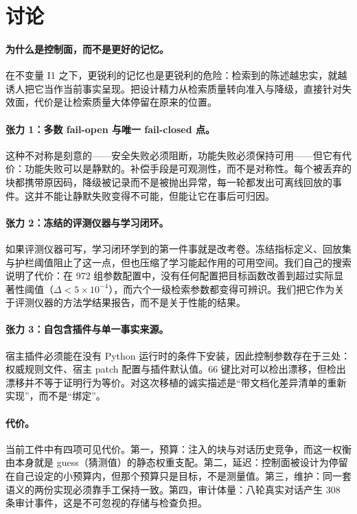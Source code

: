 \section{讨论}

\paragraph{为什么是控制面，而不是更好的记忆。} 在不变量 I1 之下，更锐利的记忆也是更锐利的危险：检索到的陈述越忠实，就越诱人把它当作当前事实呈现。把设计精力从检索质量转向准入与降级，直接针对失效面，代价是让检索质量大体停留在原来的位置。

\paragraph{张力 1：多数 fail-open 与唯一 fail-closed 点。} 这种不对称是刻意的——安全失败必须阻断，功能失败必须保持可用——但它有代价：功能失败可以是静默的。补偿手段是可观测性，而不是对称性。每个被丢弃的块都携带原因码，降级被记录而不是被抛出异常，每一轮都发出可离线回放的事件。这并不能让静默失败变得不可能，但能让它在事后可归因。

\paragraph{张力 2：冻结的评测仪器与学习闭环。} 如果评测仪器可写，学习闭环学到的第一件事就是改考卷。冻结指标定义、回放集与护栏阈值阻止了这一点，但也压缩了学习能起作用的可用空间。我们自己的搜索说明了代价：在 972 组参数配置中，没有任何配置把目标函数改善到超过实际显著性阈值（$\Delta < 5\times10^{-4}$），而六个一级检索参数都变得可辨识。我们把它作为关于评测仪器的方法学结果报告，而不是关于性能的结果。

\paragraph{张力 3：自包含插件与单一事实来源。} 宿主插件必须能在没有 Python 运行时的条件下安装，因此控制参数存在于三处：权威规则文件、宿主 patch 配置与插件默认值。66 键比对可以检出漂移，但检出漂移并不等于证明行为等价。对这次移植的诚实描述是“带文档化差异清单的重新实现”，而不是“绑定”。

\paragraph{代价。} 当前工件中有四项可见代价。第一，预算：注入的块与对话历史竞争，而这一权衡由本身就是 guess（猜测值）的静态权重支配。第二，延迟：控制面被设计为停留在自己设定的小预算内，但那个预算只是目标，不是测量值。第三，维护：同一套语义的两份实现必须靠手工保持一致。第四，审计体量：八轮真实对话产生 308 条审计事件，这是不可忽视的存储与检查负担。

